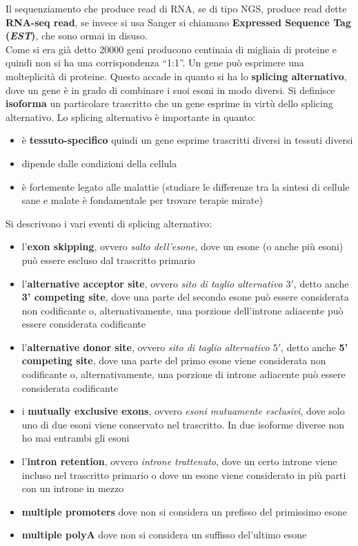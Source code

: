 \documentclass[a4paper,12pt, oneside]{book}
\begin{document}
Il sequenziamento che produce read di RNA, se di tipo NGS, produce read dette
\textbf{RNA-seq read}, se invece si usa Sanger si chiamano \textbf{Expressed
  Sequence Tag (\textit{EST})}, che sono ormai in disuso. \\
Come si era già detto 20000 geni producono centinaia di migliaia di proteine e
quindi non si ha una corrispondenza ``1:1''. Un gene può esprimere una
molteplicità di proteine. Questo accade in quanto si ha lo \textbf{splicing
  alternativo}, dove un gene è in grado di combinare i suoi esoni in modo
diversi. Si definisce \textbf{isoforma} un particolare trascritto che un gene
esprime in virtù dello splicing alternativo. Lo splicing alternativo è
importante in quanto:
\begin{itemize}
  \item è \textbf{tessuto-specifico} quindi un gene esprime trascritti diversi
  in tessuti diversi
  \item dipende dalle condizioni della cellula 
  \item è fortemente legato alle malattie (studiare le differenze tra la sintesi
  di cellule sane e malate è fondamentale per trovare terapie mirate)
\end{itemize}
Si descrivono i vari eventi di splicing alternativo:
\begin{itemize}
  \item l'\textbf{exon skipping}, ovvero \textit{salto dell'esone}, dove un
  esone 
  (o anche più esoni) può essere escluso dal trascritto primario
  \item l'\textbf{alternative acceptor site}, ovvero \textit{sito di taglio
    alternativo $3'$}, detto anche \textbf{3' competing site}, dove una parte
  del secondo esone può essere considerata 
  non codificante o, alternativamente, una porzione dell'introne adiacente può
  essere considerata codificante
  \item l'\textbf{alternative donor site}, ovvero \textit{sito di taglio
    alternativo $5'$}, detto anche \textbf{5' competing site}, dove una parte
  del primo esone viene considerata non 
  codificante o, alternativamente, una porzione di introne adiacente può
  essere considerata codificante
  \item i \textbf{mutually exclusive exons}, ovvero \textit{esoni mutuamente
    esclusivi}, dove solo uno di due esoni viene conservato nel trascritto. In
  due isoforme diverse non ho mai entrambi gli esoni
  \item l'\textbf{intron retention}, ovvero \textit{introne trattenuto}, dove un
  certo introne viene incluso nel trascritto primario o dove un esone viene
  considerato in più parti con un introne in mezzo
  \item \textbf{multiple promoters} dove non si considera un prefisso del
  primissimo esone
  \item \textbf{multiple polyA} dove non si considera un suffisso del'ultimo
  esone 
\end{itemize}
\end{document}
